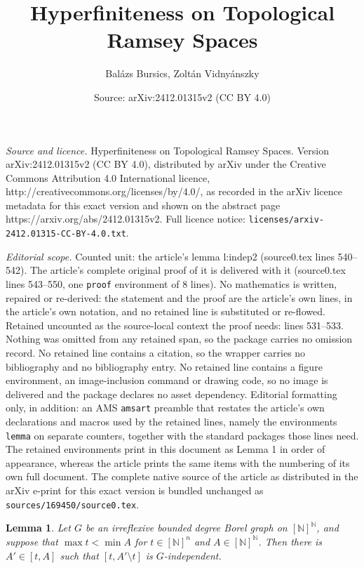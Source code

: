 \documentclass[10pt,a4paper]{amsart}
\title{Hyperfiniteness on Topological Ramsey Spaces}
\author{Bal\'azs Bursics, Zolt\'an Vidny\'anszky}
\date{Source: arXiv:2412.01315v2 (CC BY 4.0)}
\newtheorem{lemma}{Lemma}
\newcommand{\N}{\mathbb{N}}
\begin{document}
\maketitle

\noindent\emph{Source and licence.} Hyperfiniteness on Topological Ramsey Spaces. Version arXiv:2412.01315v2 (CC BY 4.0), distributed by arXiv under the Creative Commons Attribution 4.0 International licence, http://creativecommons.org/licenses/by/4.0/, as recorded in the arXiv licence metadata for this exact version and shown on the abstract page https://arxiv.org/abs/2412.01315v2. Full licence notice: \texttt{licenses/arxiv-2412.01315-CC-BY-4.0.txt}.\par\smallskip

\noindent\textit{Editorial scope.} Counted unit: the article's lemma l:indep2 (source0.tex lines 540--542). The article's complete original proof of it is delivered with it (source0.tex lines 543--550, one \texttt{proof} environment of 8 lines). No mathematics is written, repaired or re-derived: the statement and the proof are the article's own lines, in the article's own notation, and no retained line is substituted or re-flowed.  Retained uncounted as the source-local context the proof needs: lines 531--533.  Nothing was omitted from any retained span, so the package carries no omission record.  No retained line contains a citation, so the wrapper carries no bibliography and no bibliography entry.  No retained line contains a figure environment, an image-inclusion command or drawing code, so no image is delivered and the package declares no asset dependency.  Editorial formatting only, in addition: an AMS \texttt{amsart} preamble that restates the article's own declarations and macros used by the retained lines, namely the environments \texttt{lemma} on separate counters, together with the standard packages those lines need.  The retained environments print in this document as Lemma 1 in order of appearance, whereas the article prints the same items with the numbering of its own full document.  The complete native source of the article as distributed in the arXiv e-print for this exact version is bundled unchanged as \texttt{sources/169450/source0.tex}.
	\begin{lemma}
		\label{l:suslin} Let $G$ be an irreflexive bounded degree Borel graph on $[\N]^\N$, and suppose that $\max t<\min A$ for $t \in [\N]^n$ and $A\in [\N]^\N$. Then there is $A' \in [t,A]$ such that $[t,A'\setminus t]$ is $G$-independent. 
	\end{lemma}
\end{document}

